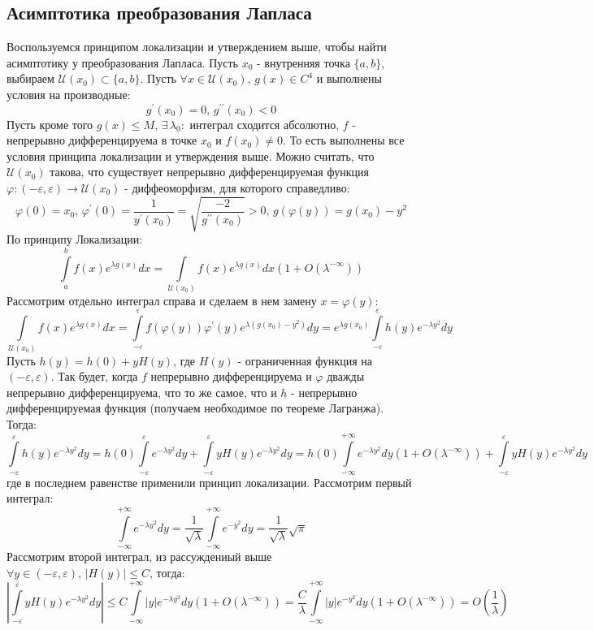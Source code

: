 \documentclass[12pt]{article}
\newcommand{\MU}{\mathcal{U}}
\newcommand{\VE}{\varepsilon}
\theoremstyle{definition}
\newcommand{\ddint}[2]{\displaystyle\int\limits_{#1}^{#2}}
\begin{document}
\subsection*{Асимптотика преобразования Лапласа}

Воспользуемся принципом локализации и утверждением выше, чтобы найти асимптотику у преобразования Лапласа. Пусть $x_0$ - внутренняя точка $\{a,b\}$, выбираем $\MU(x_0)\subset \{a,b\}$. Пусть $\forall x \in \MU(x_0), \, g(x) \in C^4$ и выполнены условия на производные: 
$$
	g^\prime(x_0) = 0, \, g^{\prime\prime}(x_0) < 0
$$
Пусть кроме того $g(x) \leq M$, $\exists \, \lambda_0 \colon$ интеграл сходится абсолютно, $f$ - непрерывно дифференцируема в точке $x_0$ и $f(x_0) \neq 0$. То есть выполнены все условия принципа локализации и утверждения выше. Можно считать, что $\MU(x_0)$ такова, что существует непрерывно дифференцируемая функция $\varphi \colon (-\VE, \VE) \to \MU(x_0)$ - диффеоморфизм, для которого справедливо:
$$
	\varphi(0) = x_0, \, \varphi^\prime(0) = \dfrac{1}{y^\prime(x_0)} = \sqrt{\dfrac{-2}{g^{\prime\prime}(x_0)}} > 0, \, g\left(\varphi(y)\right) = g(x_0) -y^2
$$
По принципу Локализации:
$$
	\ddint{a}{b}f(x)e^{\lambda g(x)}dx = \ddint{\MU(x_0)}{}f(x)e^{\lambda g(x)}dx\left(1 + O(\lambda^{-\infty})\right)
$$
Рассмотрим отдельно интеграл справа и сделаем в нем замену $x = \varphi(y)$:
$$
	\ddint{\MU(x_0)}{}f(x)e^{\lambda g(x)}dx = \ddint{-\VE}{\VE}f\left(\varphi(y)\right)\varphi^\prime(y)e^{\lambda\left(g(x_0) - y^2\right)}dy = e^{\lambda g(x_0)}\ddint{-\VE}{\VE}h(y)e^{-\lambda y^2}dy
$$
Пусть $h(y) = h(0) + y H(y)$, где $H(y)$ - ограниченная функция на $(-\VE,\VE)$. Так будет, когда $f$ непрерывно дифференцируема и $\varphi$ дважды непрерывно дифференцируема, что то же самое, что и $h$ - непрерывно дифференцируемая функция (получаем необходимое по теореме Лагранжа). Тогда:
$$
	\ddint{-\VE}{\VE}h(y)e^{-\lambda y^2}dy = h(0)\ddint{-\VE}{\VE}e^{-\lambda y^2}dy + \ddint{-\VE}{\VE}yH(y)e^{-\lambda y^2}dy = h(0)\ddint{-\infty}{+\infty}e^{-\lambda y^2}dy \left(1 + O(\lambda^{-\infty})\right) + \ddint{-\VE}{\VE}yH(y)e^{-\lambda y^2}dy
$$
где в последнем равенстве применили принцип локализации. Рассмотрим первый интеграл:
$$
	 \ddint{-\infty}{+\infty}e^{-\lambda y^2}dy =\dfrac{1}{\sqrt{\lambda}}\ddint{-\infty}{+\infty}e^{-y^2}dy =  \dfrac{1}{\sqrt{\lambda}}\sqrt{\pi} 
$$
Рассмотрим второй интеграл, из рассуждениый выше $\forall y \in (-\VE,\VE),\, |H(y)| \leq C$, тогда:
$$
	\left| \ddint{-\VE}{\VE}yH(y)e^{-\lambda y^2}dy \right|  \leq C \ddint{-\infty}{+\infty}|y|e^{-\lambda y^2}dy\left(1 + O(\lambda^{-\infty})\right) = \dfrac{C}{\lambda}\ddint{-\infty}{+\infty}|y|e^{- y^2}dy\left(1 + O(\lambda^{-\infty})\right) = O\left(\dfrac{1}{\lambda}\right)
$$
\end{document}
